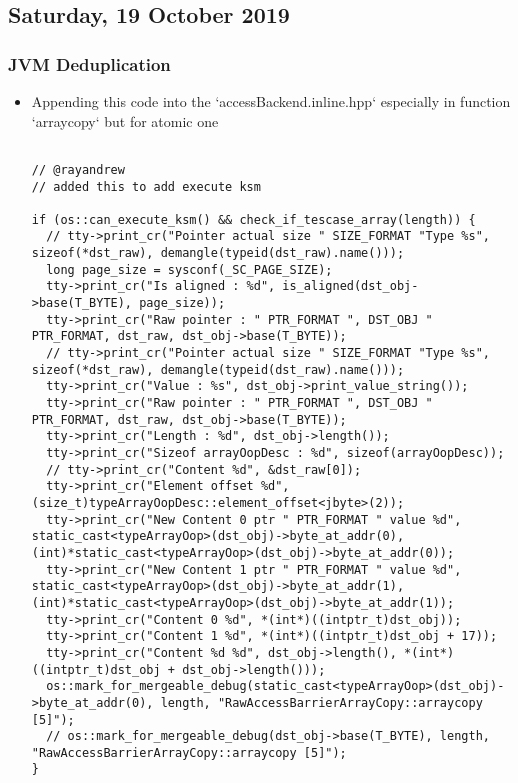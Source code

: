 \subsection{Saturday, 19 October 2019}

\subsubsection{JVM Deduplication}
\begin{itemize}
\item Appending this code into the `accessBackend.inline.hpp` especially in function `arraycopy` but for atomic one
\begin{verbatim}

// @rayandrew
// added this to add execute ksm

if (os::can_execute_ksm() && check_if_tescase_array(length)) {
  // tty->print_cr("Pointer actual size " SIZE_FORMAT "Type %s", sizeof(*dst_raw), demangle(typeid(dst_raw).name()));
  long page_size = sysconf(_SC_PAGE_SIZE);
  tty->print_cr("Is aligned : %d", is_aligned(dst_obj->base(T_BYTE), page_size));
  tty->print_cr("Raw pointer : " PTR_FORMAT ", DST_OBJ " PTR_FORMAT, dst_raw, dst_obj->base(T_BYTE));
  // tty->print_cr("Pointer actual size " SIZE_FORMAT "Type %s", sizeof(*dst_raw), demangle(typeid(dst_raw).name()));
  tty->print_cr("Value : %s", dst_obj->print_value_string());
  tty->print_cr("Raw pointer : " PTR_FORMAT ", DST_OBJ " PTR_FORMAT, dst_raw, dst_obj->base(T_BYTE));
  tty->print_cr("Length : %d", dst_obj->length());
  tty->print_cr("Sizeof arrayOopDesc : %d", sizeof(arrayOopDesc));
  // tty->print_cr("Content %d", &dst_raw[0]);
  tty->print_cr("Element offset %d", (size_t)typeArrayOopDesc::element_offset<jbyte>(2));
  tty->print_cr("New Content 0 ptr " PTR_FORMAT " value %d", static_cast<typeArrayOop>(dst_obj)->byte_at_addr(0), (int)*static_cast<typeArrayOop>(dst_obj)->byte_at_addr(0));
  tty->print_cr("New Content 1 ptr " PTR_FORMAT " value %d", static_cast<typeArrayOop>(dst_obj)->byte_at_addr(1), (int)*static_cast<typeArrayOop>(dst_obj)->byte_at_addr(1));
  tty->print_cr("Content 0 %d", *(int*)((intptr_t)dst_obj));
  tty->print_cr("Content 1 %d", *(int*)((intptr_t)dst_obj + 17));
  tty->print_cr("Content %d %d", dst_obj->length(), *(int*)((intptr_t)dst_obj + dst_obj->length()));
  os::mark_for_mergeable_debug(static_cast<typeArrayOop>(dst_obj)->byte_at_addr(0), length, "RawAccessBarrierArrayCopy::arraycopy [5]");
  // os::mark_for_mergeable_debug(dst_obj->base(T_BYTE), length, "RawAccessBarrierArrayCopy::arraycopy [5]");
}
\end{verbatim}


\end{itemize}
